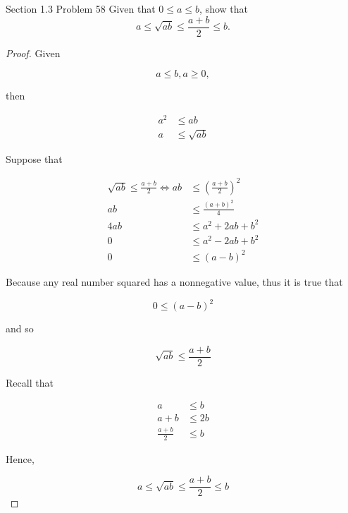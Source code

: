\documentclass{article}
\begin{document}
    \begin{tbhtheorem}{Section 1.3 Problem 58}
        Given that $0\leq a\leq b$, show that
        \begin{equation*}
            a \leq \sqrt{ab} \leq \frac{a+b}{2} \leq b.
        \end{equation*}
    \end{tbhtheorem}

    \begin{proof}

        Given

        \[
            a \leq b, a\geq 0,
        \]

        \noindent then

        \begin{align*}
            a^2  & \leq ab \\
            a    & \leq \sqrt{ab}
        \end{align*}

        \noindent Suppose that

        \begin{align*}
            \sqrt{ab} \leq \frac{a+b}{2} \iff ab  &   \leq \left(\frac{a+b}{2}\right)^2 \\
            ab  &   \leq \frac{(a+b)^2}{4} \\
            4ab &   \leq a^2 + 2ab + b^2 \\
            0   &   \leq a^2 - 2ab + b^2 \\
            0   &   \leq (a-b)^2
        \end{align*}

        \noindent Because any real number squared has a nonnegative value, thus it is true that

        \[
            0 \leq (a-b)^2
        \]

        \noindent and so

        \[
            \sqrt{ab} \leq \frac{a+b}{2}
        \]

        \noindent Recall that

        \begin{align*}
            a             & \leq  b \\
            a + b         & \leq  2b \\
            \frac{a+b}{2} & \leq b
        \end{align*}

        \noindent Hence,

        \[
            a \leq \sqrt{ab} \leq \frac{a+b}{2} \leq b
        \]

    \end{proof}
\end{document}
